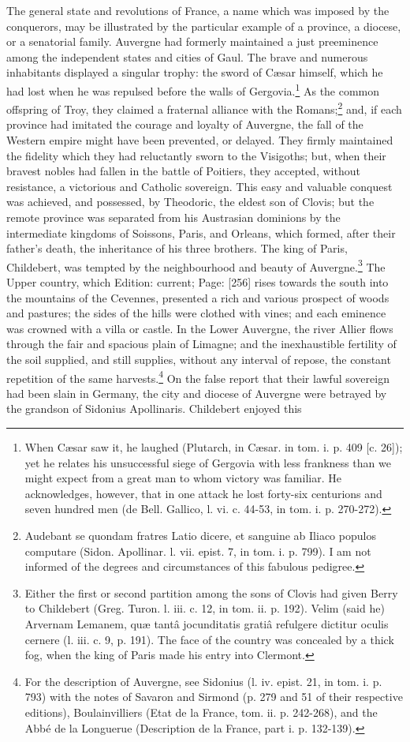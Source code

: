 The general state and revolutions of France, a name which was imposed by the conquerors, may be illustrated by the particular example of a province, a diocese, or a senatorial family. Auvergne had formerly maintained a just preeminence among the independent states and cities of Gaul. The brave and numerous inhabitants displayed a singular trophy: the sword of Cæsar himself, which he had lost when he was repulsed before the walls of Gergovia.\footnote{When Cæsar saw it, he laughed (Plutarch, in Cæsar. in tom. i. p. 409 [c. 26]); yet he relates his unsuccessful siege of Gergovia with less frankness than we might expect from a great man to whom victory was familiar. He acknowledges, however, that in one attack he lost forty-six centurions and seven hundred men (de Bell. Gallico, l. vi. c. 44-53, in tom. i. p. 270-272).} As the common offspring of Troy, they claimed a fraternal alliance with the Romans;\footnote{Audebant se quondam fratres Latio dicere, et sanguine ab Iliaco populos computare (Sidon. Apollinar. l. vii. epist. 7, in tom. i. p. 799). I am not informed of the degrees and circumstances of this fabulous pedigree.} and, if each province had imitated the courage and loyalty of Auvergne, the fall of the Western empire might have been prevented, or delayed. They firmly maintained the fidelity which they had reluctantly sworn to the Visigoths; but, when their bravest nobles had fallen in the battle of Poitiers, they accepted, without resistance, a victorious and Catholic sovereign. This easy and valuable conquest was achieved, and possessed, by Theodoric, the eldest son of Clovis; but the remote province was separated from his Austrasian dominions by the intermediate kingdoms of Soissons, Paris, and Orleans, which formed, after their father\texthebrew{}’s death, the inheritance of his three brothers. The king of Paris, Childebert, was tempted by the neighbourhood and beauty of Auvergne.\footnote{Either the first or second partition among the sons of Clovis had given Berry to Childebert (Greg. Turon. l. iii. c. 12, in tom. ii. p. 192). Velim (said he) Arvernam Lemanem, quæ tantâ jocunditatis gratiâ refulgere dictitur oculis cernere (l. iii. c. 9, p. 191). The face of the country was concealed by a thick fog, when the king of Paris made his entry into Clermont.} The Upper country, which Edition: current; Page: [256] rises towards the south into the mountains of the Cevennes, presented a rich and various prospect of woods and pastures; the sides of the hills were clothed with vines; and each eminence was crowned with a villa or castle. In the Lower Auvergne, the river Allier flows through the fair and spacious plain of Limagne; and the inexhaustible fertility of the soil supplied, and still supplies, without any interval of repose, the constant repetition of the same harvests.\footnote{For the description of Auvergne, see Sidonius (l. iv. epist. 21, in tom. i. p. 793) with the notes of Savaron and Sirmond (p. 279 and 51 of their respective editions), Boulainvilliers (Etat de la France, tom. ii. p. 242-268), and the Abbé de la Longuerue (Description de la France, part i. p. 132-139).} On the false report that their lawful sovereign had been slain in Germany, the city and diocese of Auvergne were betrayed by the grandson of Sidonius Apollinaris. Childebert enjoyed this 
